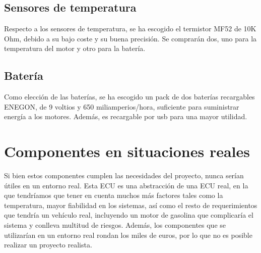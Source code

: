  \subsection{Sensores de temperatura}

 Respecto a los sensores de temperatura, se ha escogido el termistor MF52 de 10K Ohm, debido a su bajo coste y su buena precisión.
 Se comprarán dos, uno para la temperatura del motor y otro para la batería.

 \subsection{Batería}

 Como elección de las baterías, se ha escogido un pack de dos baterías recargables ENEGON, de 9 voltios y 650 miliamperios/hora, suficiente para suministrar energía a los motores. Además, es recargable por usb para una mayor utilidad.
 
\section{Componentes en situaciones reales}

Si bien estos componentes cumplen las necesidades del proyecto, nunca serían útiles en un entorno real. Esta ECU es una abstracción de una ECU real, en la que tendríamos que tener en cuenta muchos más factores tales como la temperatura, mayor fiabilidad en los sistemas, así como el resto de requerimientos que tendría un vehículo real, incluyendo un motor de gasolina que complicaría el sistema y conlleva multitud de riesgos. Además, los componentes que se utilizarían en un entorno real rondan los miles de euros, por lo que no es posible realizar un proyecto realista. 